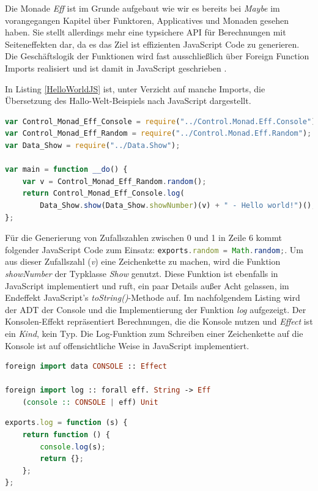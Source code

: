 \documentclass[
12pt,
ngerman,
oneside]
{scrbook} %
\begin{document}
Die Monade \emph{Eff} ist im Grunde aufgebaut wie wir es bereits bei \emph{Maybe} im vorangegangen Kapitel über Funktoren, Applicatives und Monaden gesehen haben. Sie stellt allerdings mehr eine typsichere API für Berechnungen mit Seiteneffekten dar, da es das Ziel ist effizienten JavaScript Code zu generieren. Die Geschäftslogik der Funktionen wird fast ausschließlich über Foreign Function Imports realisiert und ist damit in JavaScript geschrieben \cite[][S. 109]{Freeman17}.

In Listing \ref{HelloWorldJS} ist, unter Verzicht auf manche Imports, die Übersetzung des Hallo-Welt-Beispiels nach JavaScript dargestellt.

\begin{lstlisting}[language=javascript, style=numbered-and-boxed, caption=Übersetzung Hello World Beispiel, label=HelloWorldJS]
var Control_Monad_Eff_Console = require("../Control.Monad.Eff.Console");
var Control_Monad_Eff_Random = require("../Control.Monad.Eff.Random");
var Data_Show = require("../Data.Show");

var main = function __do() {
	var v = Control_Monad_Eff_Random.random();
	return Control_Monad_Eff_Console.log(
		Data_Show.show(Data_Show.showNumber)(v) + " - Hello world!")();
};
\end{lstlisting}

Für die Generierung von Zufallszahlen zwischen 0 und 1 in Zeile 6 kommt folgender JavaScript Code zum Einsatz: \lstinline[language=javascript, columns=fixed]{exports.random = Math.random;}. Um aus dieser Zufallszahl (\emph{v}) eine Zeichenkette zu machen, wird die Funktion \emph{showNumber} der Typklasse \emph{Show} genutzt. Diese Funktion ist ebenfalls in JavaScript implementiert und ruft, ein paar Details außer Acht gelassen, im Endeffekt JavaScript's \emph{toString()}-Methode auf. Im nachfolgendem Listing wird der ADT der Console und die Implementierung der Funktion \emph{log} aufgezeigt. Der \glqq Konsolen-Effekt\grqq{} repräsentiert Berechnungen, die die Konsole nutzen und \emph{Effect} ist ein \emph{Kind}, kein Typ. Die Log-Funktion zum Schreiben einer Zeichenkette auf die Konsole ist auf offensichtliche Weise in JavaScript implementiert.

\noindent\begin{minipage}[t]{.49\textwidth} 
	\hspace*{0pt}\begin{lstlisting}[language=purescript, style=only-rect, caption= Foreign Function PS, label=ConsolePS]
foreign import data CONSOLE :: Effect

foreign import log :: forall eff. String -> Eff 
	(console :: CONSOLE | eff) Unit
	\end{lstlisting}
\end{minipage}%
% 
\hfill%
\begin{minipage}[t]{.49\textwidth} 
	\hspace*{0pt}\begin{lstlisting}[language=javascript, style=only-rect, caption= Foreign Function JS, label=ConsoleJS] 
exports.log = function (s) {
	return function () {
		console.log(s);
		return {};
	};
};
	\end{lstlisting}
\end{minipage}
\hfill%
\end{document}
